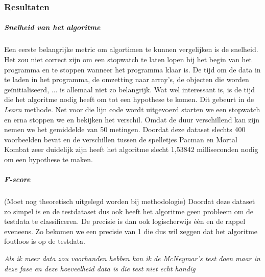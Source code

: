 \subsubsection{Resultaten}
\subparagraph{Snelheid van het algoritme} 
Een eerste belangrijke metric om algortimen te kunnen vergelijken is de snelheid. Het zou niet correct zijn om een stopwatch te laten lopen bij het begin van het programma en te stoppen wanneer het programma klaar is. De tijd om de data in te laden in het programma, de omzetting naar array's, de objecten die worden geïnitialiseerd, ... is allemaal niet zo belangrijk. Wat wel interessant is, is de tijd die het algoritme nodig heeft om tot een hypothese te komen. Dit gebeurt in de \textit{Learn} methode. 
Net voor die lijn code wordt uitgevoerd starten we een stopwatch en erna stoppen we en bekijken het verschil. Omdat de duur verschillend kan zijn nemen we het gemiddelde van 50 metingen. 
Doordat deze dataset slechts 400 voorbeelden bevat en de verschillen tussen de spelletjes Pacman en Mortal Kombat zeer duidelijk zijn heeft het algoritme slecht 1,53842 milliseconden nodig om een hypothese te maken. 
\subparagraph{F-score} (Moet nog theoretisch uitgelegd worden bij methodologie)
\newline
Doordat deze dataset zo simpel is en de testdataset dus ook heeft het algoritme geen probleem om de testdata te classificeren. De precisie is dan ook logischerwijs één en de rappel eveneens.
Zo bekomen we een precisie van 1 die dus wil zeggen dat het algoritme foutloos is op de testdata.  


\textit{Als ik meer data zou voorhanden hebben kan ik de McNeymar's test doen maar in deze fase en deze hoeveelheid data is die test niet echt handig}

